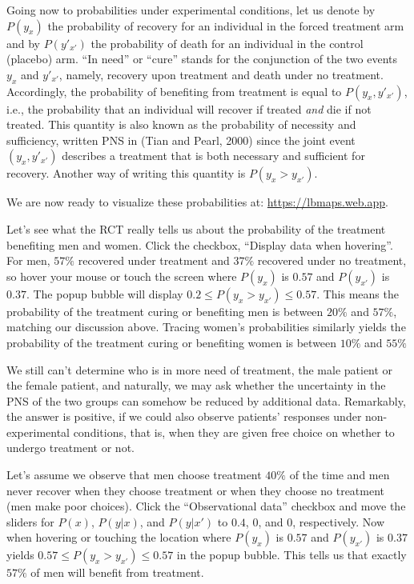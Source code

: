\documentclass{article}
\begin{document}
Going now to probabilities under experimental conditions, let us denote by $P(y_x)$ the probability of recovery for an individual in the forced treatment arm and by $P(y'_{x'})$ the probability of death for an individual in the control (placebo) arm. ``In need'' or ``cure'' stands for the conjunction of the two events $y_x$ and $y'_{x'}$, namely, recovery upon treatment and death under no treatment. Accordingly, the probability of benefiting from treatment is equal to $P(y_x, y'_{x'})$, i.e., the probability that an individual will recover if treated \emph{and} die if not treated. This quantity is also known as the probability of necessity and sufficiency, written PNS in (Tian and Pearl, 2000) since the joint event $(y_x, y'_{x'})$ describes a treatment that is both necessary and sufficient for recovery. Another way of writing this quantity is $P(y_x > y_{x'})$.

We are now ready to visualize these probabilities at: \url{https://lbmaps.web.app}.

Let's see what the RCT really tells us about the probability of the treatment benefiting men and women. Click the checkbox, ``Display data when hovering''. For men, $57\%$ recovered under treatment and $37\%$ recovered under no treatment, so hover your mouse or touch the screen where $P(y_x)$ is $0.57$ and $P(y_{x'})$ is $0.37$. The popup bubble will display $0.2 \leqslant P(y_x > y_{x'}) \leqslant 0.57$. This means the probability of the treatment curing or benefiting men is between $20\%$ and $57\%$, matching our discussion above. Tracing women's probabilities similarly yields the probability of the treatment curing or benefiting women is between $10\%$ and $55\%$

We still can't determine who is in more need of treatment, the male patient or the female patient, and naturally, we may ask whether the uncertainty in the PNS of the two groups can somehow be reduced by additional data. Remarkably, the answer is positive, if we could also observe patients' responses under non-experimental conditions, that is, when they are given free choice on whether to undergo treatment or not.

Let's assume we observe that men choose treatment $40\%$ of the time and men never recover when they choose treatment or when they choose no treatment (men make poor choices). Click the ``Observational data'' checkbox and move the sliders for $P(x)$, $P(y|x)$, and $P(y|x')$ to $0.4$, $0$, and $0$, respectively. Now when hovering or touching the location where $P(y_x)$ is $0.57$ and $P(y_{x'})$ is $0.37$ yields $0.57 \leqslant P(y_x > y_{x'}) \leqslant 0.57$ in the popup bubble. This tells us that exactly $57\%$ of men will benefit from treatment.
\end{document}

